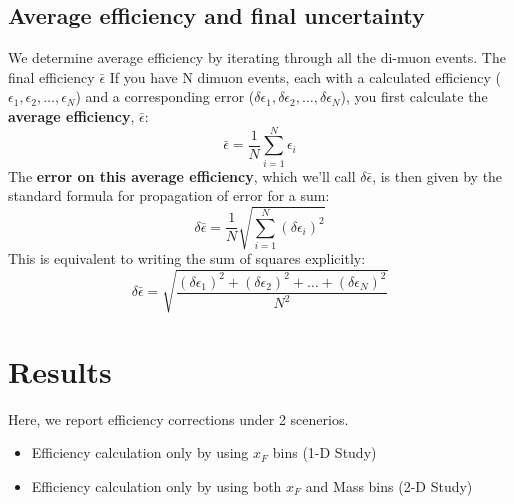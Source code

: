 \documentclass[11pt]{article}
\begin{document}
\subsection{Average efficiency and final uncertainty}
We determine average efficiency by iterating through all the di-muon events. The final efficiency $\bar{\epsilon}$
If you have N dimuon events, each with a calculated efficiency ($\epsilon_1, \epsilon_2, \dots, \epsilon_N$) and a corresponding error ($\delta\epsilon_1, \delta\epsilon_2, \dots, \delta\epsilon_N$), you first calculate the \textbf{average efficiency}, $\bar{\epsilon}$:
$$
\bar{\epsilon} = \frac{1}{N} \sum_{i=1}^{N} \epsilon_i
$$
The \textbf{error on this average efficiency}, which we'll call $\delta\bar{\epsilon}$, is then given by the standard formula for propagation of error for a sum:
$$
\delta\bar{\epsilon} = \frac{1}{N} \sqrt{\sum_{i=1}^{N} (\delta\epsilon_i)^2}
$$
This is equivalent to writing the sum of squares explicitly:
$$
\delta\bar{\epsilon} = \sqrt{\frac{(\delta\epsilon_1)^2 + (\delta\epsilon_2)^2 + \dots + (\delta\epsilon_N)^2}{N^2}}
$$

\section{Results}
Here, we report efficiency corrections under 2 scenerios.

\begin{itemize}
	\item Efficiency calculation only by using $x_{F}$ bins (1-D Study)
	\item Efficiency calculation only by using both $x_{F}$ and Mass bins (2-D Study)
\end{itemize}
\end{document}
